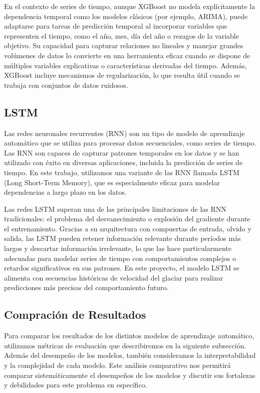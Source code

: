 \documentclass[sigconf,authordraft,language=spanish]{acmart}
\begin{document}
En el contexto de series de tiempo, aunque XGBoost no modela explícitamente la dependencia temporal como los modelos clásicos (por ejemplo, ARIMA), puede adaptarse para tareas de 
predicción temporal al incorporar variables que representen el tiempo, como el año, mes, día del año o rezagos de la variable objetivo. Su capacidad para capturar relaciones no lineales
 y manejar grandes volúmenes de datos lo convierte en una herramienta eficaz cuando se dispone de múltiples variables explicativas o características derivadas del tiempo. Además, XGBoost
incluye mecanismos de regularización, lo que resulta útil cuando se trabaja con conjuntos de datos ruidosos.


\subsection{LSTM}

Las redes neuronales recurrentes (RNN) son un tipo de modelo de aprendizaje automático que se utiliza para procesar datos secuenciales, como series de tiempo.
Las RNN son capaces de capturar patrones temporales en los datos y se han utilizado con éxito en diversas aplicaciones, incluida la predicción de series de tiempo.
En este trabajo, utilizamos una variante de las RNN llamada LSTM (Long Short-Term Memory), que es especialmente eficaz para modelar dependencias a largo plazo en los datos.

Las redes LSTM superan una de las principales limitaciones de las RNN tradicionales: el problema del desvanecimiento o explosión del gradiente durante el entrenamiento.
 Gracias a su arquitectura con compuertas de entrada, olvido y salida, las LSTM pueden retener información relevante durante períodos más largos y descartar información 
 irrelevante, lo que las hace particularmente adecuadas para modelar series de tiempo con comportamientos complejos o retardos significativos en sus patrones. En este proyecto,
  el modelo LSTM se alimenta con secuencias históricas de velocidad del glaciar para realizar predicciones más precisas del comportamiento futuro.

\subsection{Compración de Resultados}

Para comparar los resultados de los distintos modelos de aprendizaje automático, utilizamos métricas de evaluación que 
describiremos en la siguiente subsección.
Además del desempeño de los modelos, también consideramos la interpretabilidad y la complejidad de cada modelo.
Este análisis comparativo nos permitirá comparar sistemáticamente
el desempeños de los modelos y discutir sus fortalezas y debilidades para este problema en específico.
\end{document}
